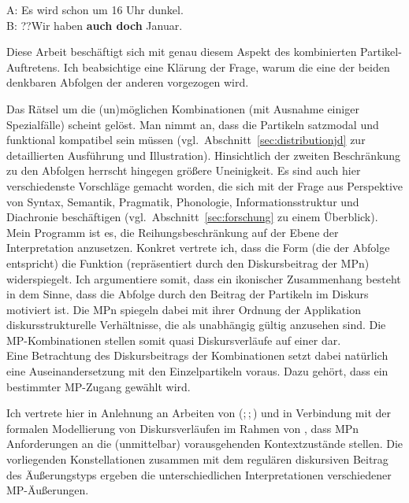 \begin{exe}
	\ex\label{13} 
		A: Es wird schon um 16 Uhr dunkel. \\
		B: ??Wir haben \textbf{auch doch }Januar.
\end{exe}
Diese Arbeit beschäftigt sich mit genau diesem Aspekt des kombinierten Partikel-Auftretens. Ich beabsichtige eine Klärung der Frage, warum die eine der beiden denkbaren Abfolgen der anderen vorgezogen wird. 

Das Rätsel um die (un)möglichen Kombinationen (mit Ausnahme einiger Spezialfälle) scheint gelöst. Man nimmt an, dass die Partikeln satzmodal und funktional kompatibel sein müssen (vgl.\ Abschnitt~\ref{sec:distributionjd} zur detaillierten Ausführung und Illustration). Hinsichtlich der zweiten Beschränkung zu den Abfolgen herrscht hingegen größere Uneinigkeit. Es sind auch hier verschiedenste Vorschläge gemacht worden, die sich mit der Frage aus Perspektive von Syntax, Semantik, Pragmatik, Phonologie, Informationsstruktur und Diachro\-nie beschäftigen (vgl.\ Abschnitt~\ref{sec:forschung} zu einem Überblick). \\

\noindent
Mein Programm ist es, die Reihungsbeschränkung auf der Ebene der Interpretation anzusetzen. Konkret vertrete ich, dass die Form (die der Abfolge entspricht) die Funktion (repräsentiert durch den Diskursbeitrag der MPn) widerspiegelt. Ich argumentiere somit, dass ein ikonischer Zusammenhang besteht in dem Sinne, dass die Abfolge durch den Beitrag der Partikeln im Diskurs motiviert ist. Die MPn spiegeln dabei mit ihrer Ordnung der Applikation diskursstrukturelle Verhältnisse, die als unabhängig gültig anzusehen sind. Die MP-Kom\-bi\-na\-ti\-on\-en stellen somit quasi Diskursverläufe auf einer  dar. \\

\noindent
Eine Betrachtung des Diskursbeitrags der Kombinationen setzt dabei natürlich eine Auseinandersetzung mit den Einzelpartikeln voraus. Dazu gehört, dass ein bestimmter MP-Zugang gewählt wird. 

Ich vertrete hier in Anlehnung an Arbeiten von \citeauthor{Diewald1999a} (\citeyear{Diewald1999a};\,\citeyear{Diewald2006};\,\citeyear{Diewald2007}) und \citet{Diewald1998} in Verbindung mit der formalen Modellierung von Diskursverläufen im Rahmen von \citet{Farkas2010}, dass MPn Anforderungen an die (unmittelbar) vorausgehenden Kontextzustände stellen. Die vorliegenden Konstellationen zusammen mit dem regulären diskursiven Beitrag des Äuße\-rungstyps ergeben die unterschiedlichen Interpretationen verschiedener MP-Äu\-ßerungen.

